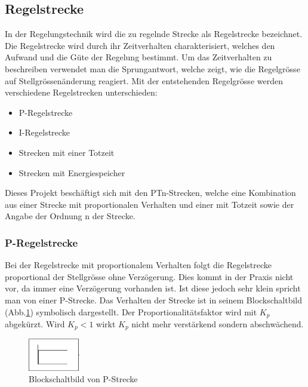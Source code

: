 \subsection{Regelstrecke}
In  der  Regelungstechnik  wird  die  zu  regelnde  Strecke  als  Regelstrecke
bezeichnet. Die  Regelstrecke wird  durch  ihr Zeitverhalten  charakterisiert,
welches den Aufwand und die G\"ute der Regelung bestimmt. Um das Zeitverhalten
zu  beschreiben  verwendet  man  die  Sprungantwort,  welche  zeigt,  wie  die
Regelgr\"osse  auf  Stellgr\"ossen\"anderung  reagiert. Mit  der  entstehenden
Regelgr\"osse werden verschiedene Regelstrecken unterschieden:

\begin{itemize}
 \item
     P-Regelstrecke
 \item
     I-Regelstrecke
 \item
     Strecken mit einer Totzeit
 \item
     Strecken mit Energiespeicher
\end{itemize}

Dieses  Projekt   besch\"aftigt  sich   mit  den  PTn-Strecken,   welche  eine
Kombination  aus einer  Strecke  mit proportionalen  Verhalten  und einer  mit
Totzeit sowie der Angabe der Ordnung n der Strecke.

\subsubsection*{P-Regelstrecke}
Bei  der  Regelstrecke mit  proportionalem  Verhalten  folgt die  Regelstrecke
proportional der  Stellgr\"osse ohne  Verz\"ogerung. Dies kommt in  der Praxis
nicht vor,  da immer eine  Verz\"ogerung vorhanden ist. Ist diese  jedoch sehr
klein  spricht man  von  einer  P-Strecke. Das Verhalten  der  Strecke ist  in
seinem Blockschaltbild  (Abb.\ref {fig:PStrecke})  symbolisch dargestellt. Der
Proportionalit\"atsfaktor wird mit $K_p$ abgek\"urzt. Wird $K_p<1$ wirkt $K_p$
nicht mehr verst\"arkend sondern abschw\"achend.

    \begin{figure}[h!, width=\pagewidth]
    \begin{center}
    \includegraphics[width=0.2\textwidth]{images/PStrecke}
    \caption{Blockschaltbild von P-Strecke}
    \label{fig:PStrecke}
    \end{center}
\end{figure}


